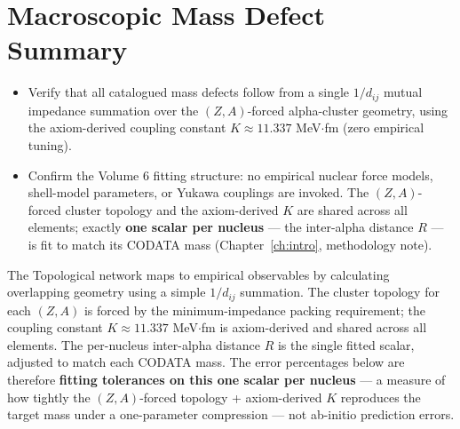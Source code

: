 \chapter*{Macroscopic Mass Defect Summary}

\begin{objectivebox}
\begin{itemize}
    \item Verify that all catalogued mass defects follow from a single $1/d_{ij}$ mutual impedance summation over the $(Z,A)$-forced alpha-cluster geometry, using the axiom-derived coupling constant $K \approx 11.337$ MeV$\cdot$fm (zero empirical tuning).
    \item Confirm the Volume 6 fitting structure: no empirical nuclear force models, shell-model parameters, or Yukawa couplings are invoked. The $(Z,A)$-forced cluster topology and the axiom-derived $K$ are shared across all elements; exactly \textbf{one scalar per nucleus} — the inter-alpha distance $R$ — is fit to match its CODATA mass (Chapter~\ref{ch:intro}, methodology note).
\end{itemize}
\end{objectivebox}

\label{ch:summary}

The Topological network maps to empirical observables by calculating overlapping geometry using a simple $1/d_{ij}$ summation. The cluster topology for each $(Z, A)$ is forced by the minimum-impedance packing requirement; the coupling constant $K \approx 11.337$ MeV$\cdot$fm is axiom-derived and shared across all elements. The per-nucleus inter-alpha distance $R$ is the single fitted scalar, adjusted to match each CODATA mass. The error percentages below are therefore \textbf{fitting tolerances on this one scalar per nucleus} — a measure of how tightly the $(Z,A)$-forced topology + axiom-derived $K$ reproduces the target mass under a one-parameter compression — not ab-initio prediction errors.

